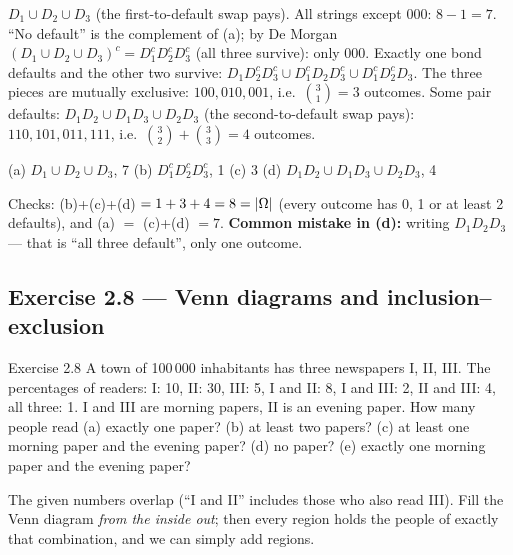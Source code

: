 	 $D_1\cup D_2\cup D_3$ (the first-to-default swap pays). All
	strings except $000$: $8-1=7$.
	 ``No default'' is the complement of (a); by De Morgan
	$(D_1\cup D_2\cup D_3)^c=D_1^cD_2^cD_3^c$ (all three survive): only $000$.
	 Exactly one bond defaults and the other two survive:
	$D_1D_2^cD_3^c\cup D_1^cD_2D_3^c\cup D_1^cD_2^cD_3$. The three pieces are
	mutually exclusive: $100,010,001$, i.e.\ $\binom31=3$ outcomes.
	 Some pair defaults: $D_1D_2\cup D_1D_3\cup D_2D_3$ (the
	second-to-default swap pays): $110,101,011,111$, i.e.\
	$\binom32+\binom33=4$ outcomes.
	\begin{answer}
		(a) $D_1\cup D_2\cup D_3$, 7 \quad (b) $D_1^cD_2^cD_3^c$, 1 \quad
		(c) 3 \quad (d) $D_1D_2\cup D_1D_3\cup D_2D_3$, 4
	\end{answer}
	\begin{remark}
		Checks: (b)+(c)+(d) $=1+3+4=8=|\Omega|$ (every outcome has 0, 1 or at least 2
		defaults), and (a) $=$ (c)+(d) $=7$. \textbf{Common mistake in (d):}
		writing $D_1D_2D_3$ --- that is ``all three default'', only one outcome.
	\end{remark}
\fi

\subsection{Exercise 2.8 --- Venn diagrams and inclusion--exclusion}

\begin{task}{Exercise 2.8}
	A town of 100\,000 inhabitants has three newspapers I, II, III. The
	percentages of readers: I: 10, II: 30, III: 5, I and II: 8, I and III: 2,
	II and III: 4, all three: 1. I and III are morning papers, II is an
	evening paper. How many people read (a) exactly one paper? (b) at least two
	papers? (c) at least one morning paper and the evening paper? (d) no paper?
	(e) exactly one morning paper and the evening paper?
\end{task}
\workspace{4cm}

\ifsolutions
	\soltitle
	\idea The given numbers overlap (``I and II'' includes those who also read
	III). Fill the Venn diagram \emph{from the inside out}; then every region
	holds the people of exactly that combination, and we can simply add regions.

